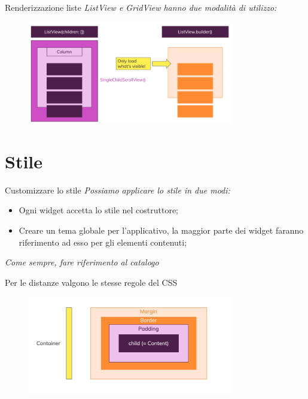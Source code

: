 \documentclass{../libs/presentation_format}
\begin{document}
\begin{frame}{Renderizzazione liste}
	\emph{ListView e GridView hanno due modalità di utilizzo: }
	\newline
	\begin{figure}[htpb]
		\centering
		\includegraphics[width=9cm]{../libs/list-view-utilization}
	\end{figure}
\end{frame}


\section{Stile}
\begin{frame}{Customizzare lo stile}
	\emph{Possiamo applicare lo stile in due modi:}
	\begin{itemize}
		\item Ogni widget accetta lo stile nel costruttore;
		\item Creare un tema globale per l'applicativo, la maggior parte dei widget faranno riferimento ad esso per gli elementi contenuti;
	\end{itemize}
	\emph{Come sempre, fare riferimento al catalogo}
	\newline
	\centering
	\href{https://docs.flutter.dev/development/ui/widgets}{}
\end{frame}


\begin{frame}{Per le distanze valgono le stesse regole del CSS}
	\begin{figure}[htpb]
		\centering
		\includegraphics[width=9cm]{../libs/container-style}
	\end{figure}
\end{frame}
\end{document}
